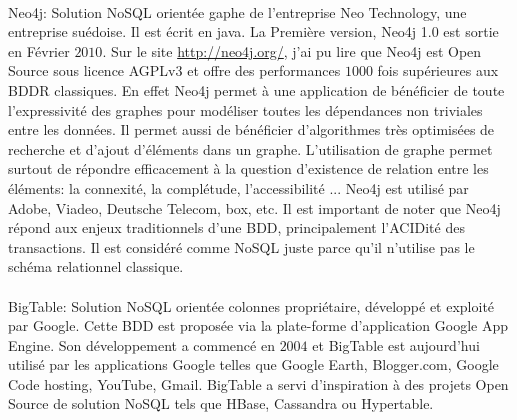 \\
\textsf{Neo4j}:  Solution \textsf{NoSQL} orientée 
\textsf{gaphe} de l'entreprise \textsf{Neo Technology}, une entreprise suédoise\cite{MichaelFiguiereNeo4j}. Il est écrit en java\cite{GavinTerrill}. La Première version, \textsf{Neo4j 1.0} est sortie en Février $2010$\cite{Neo4jBlog}. 
Sur le site \url{http://neo4j.org/}, j'ai pu lire que \textsf{Neo4j}
est \textsf{Open Source} sous licence \textsf{AGPLv3} et offre des
performances $1000$ fois supérieures aux \textsf{BDDR} classiques. En
effet \textsf{Neo4j} permet à une application de bénéficier de toute
l'expressivité des graphes pour modéliser toutes les dépendances non
triviales entre les données. Il permet aussi de bénéficier
d'algorithmes très optimisées de recherche et d'ajout d'éléments dans
un graphe. L'utilisation de graphe permet surtout de répondre
efficacement à la question d'existence de relation entre les éléments:
la connexité, la complétude, l'accessibilité ... \textsf{Neo4j} est
utilisé par \textsf{Adobe, Viadeo, Deutsche Telecom, box,
etc}\cite{neo4jClients}. 
Il est important de noter que \textsf{Neo4j} répond aux enjeux traditionnels 
d'une \textsf{BDD}, principalement l'\textsf{ACIDité} des transactions. 
Il est considéré comme \textsf{NoSQL} juste parce qu'il n'utilise
pas le schéma relationnel classique.
\\
\\
\textsf{BigTable}:  Solution \textsf{NoSQL} orientée 
\textsf{colonnes} propriétaire, développé et exploité par Google. Cette 
\textsf{BDD} est proposée via la plate-forme d'application 
\textsf{Google App Engine}. Son
développement a commencé en $2004$ et \textsf{BigTable} est aujourd'hui 
utilisé par les
applications \textsf{Google} telles que \textsf{Google Earth},
\textsf{Blogger.com}, \textsf{Google Code hosting}, \textsf{YouTube},
\textsf{Gmail}. \textsf{BigTable} a servi d'inspiration à des projets 
\textsf{Open Source} de solution \textsf{NoSQL} tels que \textsf{HBase},
\textsf{Cassandra} ou \textsf{Hypertable}\cite{RickCattell}.
